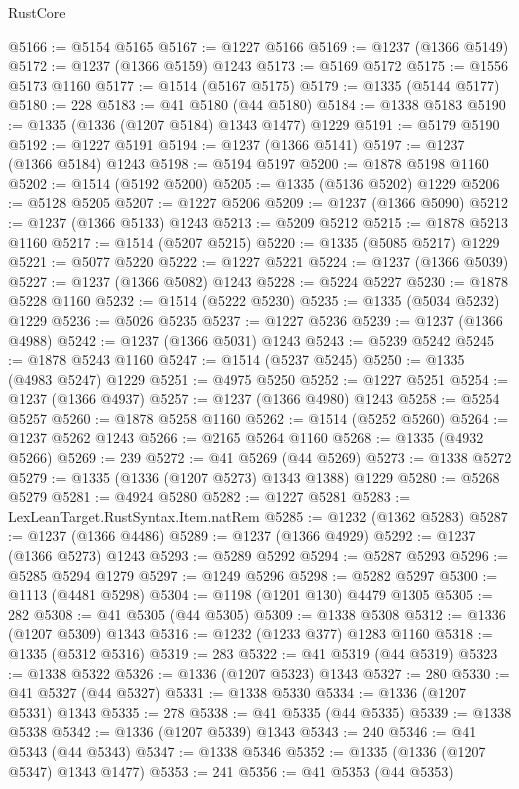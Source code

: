 \begin{lexlean}{RustCore}
\begin{coremodule}
@5166 := @5154 @5165
@5167 := @1227 @5166
@5169 := @1237 (@1366 @5149)
@5172 := @1237 (@1366 @5159) @1243
@5173 := @5169 @5172
@5175 := @1556 @5173 @1160
@5177 := @1514 (@5167 @5175)
@5179 := @1335 (@5144 @5177)
@5180 := 228
@5183 := @41 @5180 (@44 @5180)
@5184 := @1338 @5183
@5190 := @1335 (@1336 (@1207 @5184) @1343 @1477) @1229
@5191 := @5179 @5190
@5192 := @1227 @5191
@5194 := @1237 (@1366 @5141)
@5197 := @1237 (@1366 @5184) @1243
@5198 := @5194 @5197
@5200 := @1878 @5198 @1160
@5202 := @1514 (@5192 @5200)
@5205 := @1335 (@5136 @5202) @1229
@5206 := @5128 @5205
@5207 := @1227 @5206
@5209 := @1237 (@1366 @5090)
@5212 := @1237 (@1366 @5133) @1243
@5213 := @5209 @5212
@5215 := @1878 @5213 @1160
@5217 := @1514 (@5207 @5215)
@5220 := @1335 (@5085 @5217) @1229
@5221 := @5077 @5220
@5222 := @1227 @5221
@5224 := @1237 (@1366 @5039)
@5227 := @1237 (@1366 @5082) @1243
@5228 := @5224 @5227
@5230 := @1878 @5228 @1160
@5232 := @1514 (@5222 @5230)
@5235 := @1335 (@5034 @5232) @1229
@5236 := @5026 @5235
@5237 := @1227 @5236
@5239 := @1237 (@1366 @4988)
@5242 := @1237 (@1366 @5031) @1243
@5243 := @5239 @5242
@5245 := @1878 @5243 @1160
@5247 := @1514 (@5237 @5245)
@5250 := @1335 (@4983 @5247) @1229
@5251 := @4975 @5250
@5252 := @1227 @5251
@5254 := @1237 (@1366 @4937)
@5257 := @1237 (@1366 @4980) @1243
@5258 := @5254 @5257
@5260 := @1878 @5258 @1160
@5262 := @1514 (@5252 @5260)
@5264 := @1237 @5262 @1243
@5266 := @2165 @5264 @1160
@5268 := @1335 (@4932 @5266)
@5269 := 239
@5272 := @41 @5269 (@44 @5269)
@5273 := @1338 @5272
@5279 := @1335 (@1336 (@1207 @5273) @1343 @1388) @1229
@5280 := @5268 @5279
@5281 := @4924 @5280
@5282 := @1227 @5281
@5283 := LexLeanTarget.RustSyntax.Item.natRem
@5285 := @1232 (@1362 @5283)
@5287 := @1237 (@1366 @4486)
@5289 := @1237 (@1366 @4929)
@5292 := @1237 (@1366 @5273) @1243
@5293 := @5289 @5292
@5294 := @5287 @5293
@5296 := @5285 @5294 @1279
@5297 := @1249 @5296
@5298 := @5282 @5297
@5300 := @1113 (@4481 @5298)
@5304 := @1198 (@1201 @130) @4479 @1305
@5305 := 282
@5308 := @41 @5305 (@44 @5305)
@5309 := @1338 @5308
@5312 := @1336 (@1207 @5309) @1343
@5316 := @1232 (@1233 @377) @1283 @1160
@5318 := @1335 (@5312 @5316)
@5319 := 283
@5322 := @41 @5319 (@44 @5319)
@5323 := @1338 @5322
@5326 := @1336 (@1207 @5323) @1343
@5327 := 280
@5330 := @41 @5327 (@44 @5327)
@5331 := @1338 @5330
@5334 := @1336 (@1207 @5331) @1343
@5335 := 278
@5338 := @41 @5335 (@44 @5335)
@5339 := @1338 @5338
@5342 := @1336 (@1207 @5339) @1343
@5343 := 240
@5346 := @41 @5343 (@44 @5343)
@5347 := @1338 @5346
@5352 := @1335 (@1336 (@1207 @5347) @1343 @1477)
@5353 := 241
@5356 := @41 @5353 (@44 @5353)

\end{coremodule}
\end{lexlean}
